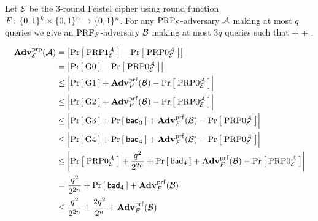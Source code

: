 \newpage

\begin{theorem}
Let $\Feistel$ be the 3-round Feistel cipher using round function 
$F\Colon\bits^k\times\bits^n\rightarrow \bits^n$. For any
$\PRP_\cipher$-adversary $\advA$ making at most $q$ queries 
we give an $\PRF_F$-adversary $\advB$ making at most $3q$ queries such that
\bnm
  \AdvPRP{\Feistel}{\advA} \le {} +  +
   \;.
\enm
\end{theorem}



\begin{align*}
\AdvPRP{\cipher}{\advA} 
    &= \left|\Prob{\PRP1^\advA_\cipher} - \Prob{\PRP0^\advA_\cipher}\right|\\
    &= \left|\Prob{\G0} - \Prob{\PRP0^\advA_\cipher}\right|\\
    &\le \left|\Prob{\G1} + \AdvPRF{F}{\advB} - \Prob{\PRP0^\advA_\cipher}\right|\\
    &\le \left|\Prob{\G2} + \AdvPRF{F}{\advB} - \Prob{\PRP0^\advA_\cipher}\right|\\
    &\le \left|\Prob{\G3} + \Prob{\bad_3} + \AdvPRF{F}{\advB} - \Prob{\PRP0^\advA_\cipher}\right|\\
    &\le \left|\Prob{\G4} + \Prob{\bad_4} + \AdvPRF{F}{\advB} - \Prob{\PRP0^\advA_\cipher}\right|\\
    &\le \left|\Prob{\PRP0^\advA_\cipher} + \frac{q^2}{2^{2n}} + \Prob{\bad_4} + \AdvPRF{F}{\advB} - \Prob{\PRP0^\advA_\cipher}\right|\\
    &= \frac{q^2}{2^{2n}} + \Prob{\bad_4} + \AdvPRF{F}{\advB}\\
    &\le \frac{q^2}{2^{2n}} + \frac{2q^2}{2^n} + \AdvPRF{F}{\advB}\\
\end{align*}

